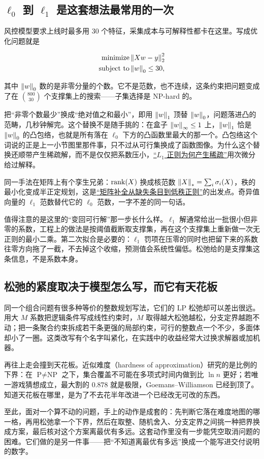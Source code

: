 \subsection{\(\ell_0\) 到 \(\ell_1\) 是这套想法最常用的一次}

风控模型要求上线时最多用 30 个特征，采集成本与可解释性都卡在这里。写成优化问题就是

\[
\begin{aligned}
\text{minimize}\space&\left\lVert Xw-y\right\rVert_2^2\\
\text{subject to}\space&\left\lVert w\right\rVert_0\le30,
\end{aligned}
\]

其中 \(\left\lVert w\right\rVert_0\) 数的是非零分量的个数。它不是范数，也不连续，这条约束把问题变成了在 \(\binom{800}{30}\) 个支撑集上的搜索——子集选择是 NP-hard 的。

把``非零个数最少''换成``绝对值之和最小''，即用 \(\left\lVert w\right\rVert_1\) 顶替 \(\left\lVert w\right\rVert_0\)，问题落进凸的范畴，几秒钟解完。这个替换不是随手挑的：在盒子 \(\left\lVert w\right\rVert_\infty\le1\) 上，\(\left\lVert w\right\rVert_1\) 恰是 \(\left\lVert w\right\rVert_0\) 的凸包络，也就是所有落在 \(\ell_0\) 下方的凸函数里最大的那一个。凸包络这个词说的正是上一小节图里那件事，只不过从可行集换成了函数图像。为什么这个替换还顺带产生稀疏解，而不是仅仅把系数压小，\hyperref[sec:09-Convex-Optimization/07-Applications/02]{``\(L_1\) 正则为何产生稀疏''}用次微分给过解释。

同一手法在矩阵上有个孪生兄弟：\(\operatorname{rank}(X)\) 换成核范数 \(\left\lVert X\right\rVert_{*}=\sum_i\sigma_i(X)\)，秩的最小化变成半正定规划，这是\hyperref[sec:13-Machine-Learning/04-Dimensionality-Reduction/03]{``矩阵补全从缺失条目到低秩正则''}的出发点。奇异值向量的 \(\ell_1\) 范数替代它的 \(\ell_0\) 范数，一字不差的同一句话。

值得注意的是这里的``变回可行解''那一步长什么样。\(\ell_1\) 解通常给出一批很小但非零的系数，工程上的做法是按阈值截断取支撑集，再在这个支撑集上重新做一次无正则的最小二乘。第二次拟合是必要的：\(\ell_1\) 罚项在压零的同时也把留下来的系数往零方向拖了一截，不去掉这个收缩，预测值会系统性偏低。松弛给的是支撑集这条信息，不是系数本身。

\subsection{松弛的紧度取决于模型怎么写，而它有天花板}

同一个组合问题有很多种等价的整数规划写法，它们的 LP 松弛却可以差出很远。用大 \(M\) 系数把逻辑条件写成线性约束时，\(M\) 取得越大松弛越松，分支定界越跑不动；把一条聚合约束拆成若干条更强的局部约束，可行的整数点一个不少，多面体却小了一圈。这类改写有个名字叫紧化，在实践中的收益经常大过换求解器或加机器。

再往上走会撞到天花板。近似难度（hardness of approximation）研究的是比例的下界：在 \(\text{P}\ne\text{NP}\) 之下，集合覆盖不可能在多项式时间内做到比 \(\ln n\) 更好；若唯一游戏猜想成立，最大割的 \(0.878\) 就是极限，Goemans--Williamson 已经到顶了。知道天花板在哪里，是为了不去花半年改进一个已经改无可改的东西。

至此，面对一个算不动的问题，手上的动作是成套的：先判断它落在难度地图的哪一格，再用松弛拿一个下界，然后在取整、随机舍入、分支定界之间挑一种把界换成方案，最后核对这个方案离最优有多远。这套动作里没有一步能凭空取消问题的困难。它们做的是另一件事——把``不知道离最优有多远''换成一个能写进交付说明的数字。
